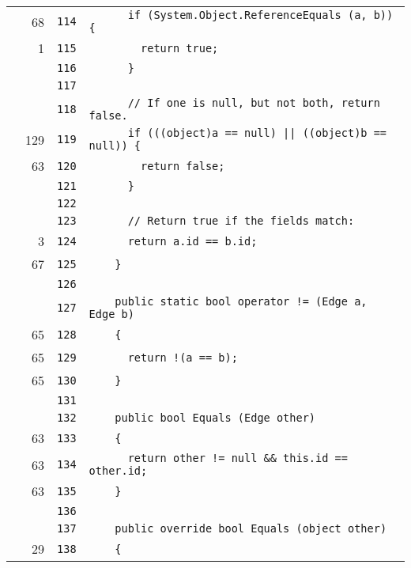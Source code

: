 \documentclass[a4paper,10pt]{article}
\begin{document}
\begin{longtable}[l]{lrrl}
\cellcolor{green} & 68 & \verb~114~ & \verb~      if (System.Object.ReferenceEquals (a, b)) {~\\
\cellcolor{green} & 1 & \verb~115~ & \verb~        return true;~\\
\cellcolor{gray} &  & \verb~116~ & \verb~      }~\\
\cellcolor{gray} &  & \verb~117~ & \verb~~\\
\cellcolor{gray} &  & \verb~118~ & \verb~      // If one is null, but not both, return false.~\\
\cellcolor{green} & 129 & \verb~119~ & \verb~      if (((object)a == null) || ((object)b == null)) {~\\
\cellcolor{green} & 63 & \verb~120~ & \verb~        return false;~\\
\cellcolor{gray} &  & \verb~121~ & \verb~      }~\\
\cellcolor{gray} &  & \verb~122~ & \verb~~\\
\cellcolor{gray} &  & \verb~123~ & \verb~      // Return true if the fields match:~\\
\cellcolor{green} & 3 & \verb~124~ & \verb~      return a.id == b.id;~\\
\cellcolor{green} & 67 & \verb~125~ & \verb~    }~\\
\cellcolor{gray} &  & \verb~126~ & \verb~~\\
\cellcolor{gray} &  & \verb~127~ & \verb~    public static bool operator != (Edge a, Edge b)~\\
\cellcolor{green} & 65 & \verb~128~ & \verb~    {~\\
\cellcolor{green} & 65 & \verb~129~ & \verb~      return !(a == b);~\\
\cellcolor{green} & 65 & \verb~130~ & \verb~    }~\\
\cellcolor{gray} &  & \verb~131~ & \verb~~\\
\cellcolor{gray} &  & \verb~132~ & \verb~    public bool Equals (Edge other)~\\
\cellcolor{green} & 63 & \verb~133~ & \verb~    {~\\
\cellcolor{green} & 63 & \verb~134~ & \verb~      return other != null && this.id == other.id;~\\
\cellcolor{green} & 63 & \verb~135~ & \verb~    }~\\
\cellcolor{gray} &  & \verb~136~ & \verb~~\\
\cellcolor{gray} &  & \verb~137~ & \verb~    public override bool Equals (object other)~\\
\cellcolor{green} & 29 & \verb~138~ & \verb~    {~\\

\end{longtable}
\end{document}
